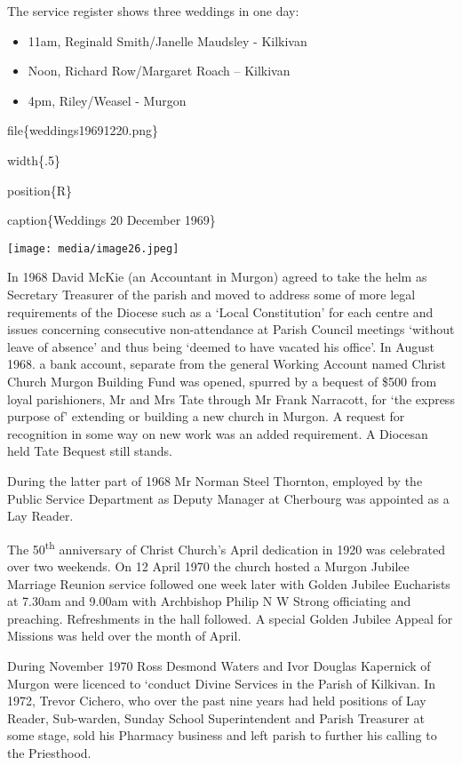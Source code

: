 The service register shows three weddings in one day:

\begin{itemize}
\item
  11am, Reginald Smith/Janelle Maudsley - Kilkivan
\item
  Noon, Richard Row/Margaret Roach -- Kilkivan
\item
  4pm, Riley/Weasel - Murgon
\end{itemize}

file\{weddings19691220.png\}

width\{.5\}

position\{R\}

caption\{Weddings 20 December 1969\}

\texttt{[image: media/image26.jpeg]}

In 1968 David McKie (an Accountant in Murgon) agreed to take the helm as
Secretary Treasurer of the parish and moved to address some of more
legal requirements of the Diocese such as a `Local Constitution' for
each centre and issues concerning consecutive non-attendance at Parish
Council meetings `without leave of absence' and thus being `deemed to
have vacated his office'. In August 1968. a bank account, separate from
the general Working Account named Christ Church Murgon Building Fund was
opened, spurred by a bequest of \$500 from loyal parishioners, Mr and
Mrs Tate through Mr Frank Narracott, for `the express purpose of'
extending or building a new church in Murgon. A request for recognition
in some way on new work was an added requirement. A Diocesan held Tate
Bequest still stands.

During the latter part of 1968 Mr Norman Steel Thornton, employed by the
Public Service Department as Deputy Manager at Cherbourg was appointed
as a Lay Reader.

The 50\textsuperscript{th} anniversary of Christ Church's April
dedication in 1920 was celebrated over two weekends. On 12 April 1970
the church hosted a Murgon Jubilee Marriage Reunion service followed one
week later with Golden Jubilee Eucharists at 7.30am and 9.00am with
Archbishop Philip N W Strong officiating and preaching. Refreshments in
the hall followed. A special Golden Jubilee Appeal for Missions was held
over the month of April.

During November 1970 Ross Desmond Waters and Ivor Douglas Kapernick of
Murgon were licenced to `conduct Divine Services in the Parish of
Kilkivan. In 1972, Trevor Cichero, who over the past nine years had held
positions of Lay Reader, Sub-warden, Sunday School Superintendent and
Parish Treasurer at some stage, sold his Pharmacy business and left
parish to further his calling to the Priesthood.

